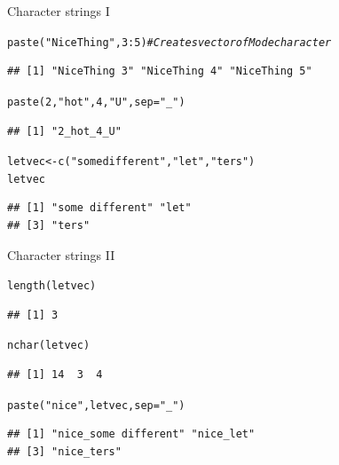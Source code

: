 \documentclass[xcolor=table,           xcolor=dvipsnames]{beamer}\usepackage[]{graphicx}\usepackage[]{color}
\makeatletter
\newcommand{\hlnum}[1]{\textcolor[rgb]{0,0,0}{#1}}
\newcommand{\hlstr}[1]{\textcolor[rgb]{0.545,0.137,0.137}{#1}}
\newcommand{\hlcom}[1]{\textcolor[rgb]{0,0.392,0}{\textit{#1}}}
\newcommand{\hlopt}[1]{\textcolor[rgb]{0,0,0}{#1}}
\newcommand{\hlstd}[1]{\textcolor[rgb]{0,0,0}{#1}}
\newcommand{\hlkwb}[1]{\textcolor[rgb]{0,0,0}{#1}}
\newcommand{\hlkwc}[1]{\textcolor[rgb]{1,0,1}{#1}}
\newcommand{\hlkwd}[1]{\textcolor[rgb]{0,0,1}{#1}}
\newenvironment{kframe}{%
 \def\at@end@of@kframe{}%
 \ifinner\ifhmode%
  \def\at@end@of@kframe{\end{minipage}}%
  \begin{minipage}{\columnwidth}%
 \fi\fi%
 \def\FrameCommand##1{\hskip\@totalleftmargin \hskip-\fboxsep
 \colorbox{shadecolor}{##1}\hskip-\fboxsep
     \hskip-\linewidth \hskip-\@totalleftmargin \hskip\columnwidth}%
 \MakeFramed {\advance\hsize-\width
   \@totalleftmargin\z@ \linewidth\hsize
   \@setminipage}}%
 {\par\unskip\endMakeFramed%
 \at@end@of@kframe}
\newenvironment{knitrout}{}{} %
\makeatother
\begin{document}
\begin{frame}[fragile]{Character strings I}
\begin{knitrout}
\color{fgcolor}\begin{kframe}
\begin{alltt}
\hlkwd{paste}\hlstd{(}\hlstr{"NiceThing"}\hlstd{,} \hlnum{3}\hlopt{:}\hlnum{5}\hlstd{)} \hlcom{# Creates vector of Mode character}
\end{alltt}
\begin{verbatim}
## [1] "NiceThing 3" "NiceThing 4" "NiceThing 5"
\end{verbatim}
\begin{alltt}
\hlkwd{paste}\hlstd{(}\hlnum{2}\hlstd{,} \hlstr{"hot"}\hlstd{,} \hlnum{4}\hlstd{,} \hlstr{"U"}\hlstd{,} \hlkwc{sep}\hlstd{=}\hlstr{"_"}\hlstd{)}
\end{alltt}
\begin{verbatim}
## [1] "2_hot_4_U"
\end{verbatim}
\begin{alltt}
\hlstd{letvec} \hlkwb{<-} \hlkwd{c}\hlstd{(}\hlstr{"some different"}\hlstd{,} \hlstr{"let"}\hlstd{,} \hlstr{"ters"}\hlstd{)}
\hlstd{letvec}
\end{alltt}
\begin{verbatim}
## [1] "some different" "let"           
## [3] "ters"
\end{verbatim}
\end{kframe}
\end{knitrout}
\end{frame}


\begin{frame}[fragile]{Character strings II}
\begin{knitrout}
\color{fgcolor}\begin{kframe}
\begin{alltt}
\hlkwd{length}\hlstd{(letvec)}
\end{alltt}
\begin{verbatim}
## [1] 3
\end{verbatim}
\begin{alltt}
\hlkwd{nchar}\hlstd{(letvec)}
\end{alltt}
\begin{verbatim}
## [1] 14  3  4
\end{verbatim}
\begin{alltt}
\hlkwd{paste}\hlstd{(}\hlstr{"nice"}\hlstd{, letvec,} \hlkwc{sep}\hlstd{=}\hlstr{"_"}\hlstd{)}
\end{alltt}
\begin{verbatim}
## [1] "nice_some different" "nice_let"           
## [3] "nice_ters"
\end{verbatim}
\end{kframe}
\end{knitrout}
\end{frame}
\end{document}
